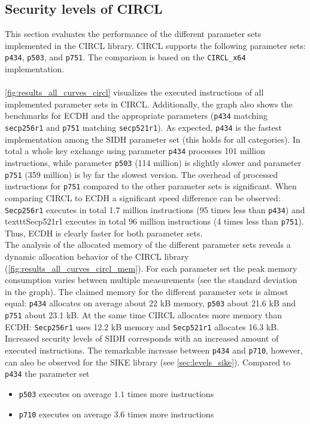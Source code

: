 \subsection{Security levels of CIRCL}\label{sec:levels_circl}
This section evaluates the performance of the different parameter sets implemented in the \gls{CIRCL} library. \gls{CIRCL} supports the following parameter sets: \texttt{p434}, \texttt{p503}, and \texttt{p751}. The comparison is based on the \texttt{CIRCL\_x64} implementation.\\\\
\autoref{fig:results_all_curves_circl} visualizes the executed instructions of all implemented parameter sets in \gls{CIRCL}. Additionally, the graph also shows the benchmarks for ECDH and the appropriate parameters (\texttt{p434} matching \texttt{secp256r1} and \texttt{p751} matching \texttt{secp521r1}). As expected, \texttt{p434} is the fastest implementation among the \gls{SIDH} parameter set (this holds for all categories). In total a whole key exchange using parameter \texttt{p434} processes 101 million instructions, while parameter \texttt{p503} (114 million) is slightly slower and parameter \texttt{p751} (359 million) is by far the slowest version. The overhead of processed instructions for \texttt{p751} compared to the other parameter sets is significant.
When comparing \gls{CIRCL} to \gls{ECDH} a significant speed difference can be observed: \texttt{Secp256r1} executes in total 1.7 million instructions (95 times less than \texttt{p434}) and texttt{Secp521r1} executes in total 96 million instructions (4 times less than \texttt{p751}). Thus, \gls{ECDH} is clearly faster for both parameter sets.\\
The analysis of the allocated memory of the different parameter sets reveals a dynamic allocation behavior of the \gls{CIRCL} library (\autoref{fig:results_all_curves_circl_mem}). For each parameter set the peak memory consumption varies between multiple measurements (see the standard deviation in the graph). The claimed memory for the different parameter sets is almost equal: \texttt{p434} allocates on average about 22 \gls{kB} memory, \texttt{p503} about 21.6 \gls{kB} and \texttt{p751} about 23.1 \gls{kB}. At the same time \gls{CIRCL} allocates more memory than \gls{ECDH}: \texttt{Secp256r1} uses 12.2 \gls{kB} memory  and \texttt{Secp521r1} allocates 16.3 \gls{kB}.\\

Increased security levels of \gls{SIDH} corresponds with an increased amount of executed instructions. The remarkable increase between \texttt{p434} and \texttt{p710}, however, can also be observed for the \gls{SIKE} library (see \autoref{sec:levels_sike}). Compared to \texttt{p434} the parameter set
\begin{itemize}
\itemsep0em 
\item \texttt{p503} executes on average $1.1$ times more instructions
\item \texttt{p710} executes on average $3.6$ times more instructions
\end{itemize}

